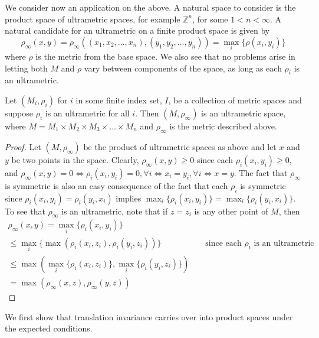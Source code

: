 We consider now an application on the above. A natural space to consider is the product space of ultrametric spaces, for example $\mathbb{Z}^n$, for some $1 < n < \infty$. A natural candidate for an ultrametric on a finite product space is given by
\[ \rho_\infty(x,y) = \rho_\infty((x_1,x_2,\ldots,x_n),(y_1,y_2, \ldots, y_n)) = \max_{i} \{\rho(x_i, y_i)\}\] where $\rho$ is the metric from the base space.  We also see that no problems arise in letting both $M$ and $\rho$ vary between components of the space, as long as each $\rho_i$ is an ultrametric.\\

\begin{proposition}
Let $(M_i, \rho_i)$ for $i$ in some finite index set, $I$, be a collection of metric spaces and suppose $\rho_i$ is an ultrametric for all $i$. Then $(M,\rho_\infty)$ is an ultrametric space, where $M=M_1 \times M_2 \times M_3 \times \ldots \times M_n$ and $\rho_\infty$ is the metric described above.
\end{proposition}

\begin{proof}
Let $(M, \rho_\infty)$ be the product of ultrametric spaces as above and let $x$ and $y$ be two points in the space. Clearly, $\rho_\infty(x,y) \geq 0$ since each $\rho_i(x_i,y_i) \geq 0$, and $\rho_\infty(x,y) = 0 \iff \rho_i(x_i,y_i) =0,\forall i \iff x_i=y_i, \forall i \iff x=y$. The fact that $\rho_\infty$ is symmetric is also an easy consequence of the fact that each $\rho_i$ is symmetric since  $\rho_i(x_i, y_i) = \rho_i(y_i, x_i)$ implies $\max_{i}\{\rho_i(x_i, y_i)\} = \max_i\{\rho_i(y_i, x_i)\}$. To see that $\rho_\infty$ is an ultrametric, note that if $z=z_i$ is any other point of $M$, then
\begin{align*}
    \rho_\infty(x, y) = \max_i\{\rho_i(x_i,y_i)\} && \\
    \leq \max_i\{\max(\rho_i(x_i,z_i),\rho_i(y_i,z_i))\} && \text{ since each $\rho_i$ is an ultrametric } \\
    \leq \max(\max_i\{\rho_i(x_i,z_i)\}, \max_i\{\rho_i(y_i,z_i)\})  \\
    = \max(\rho_\infty(x,z),\rho_\infty(y,z))  
\end{align*}
\end{proof}

We first show that translation invariance carries over into product spaces under the expected conditions.\\ 

